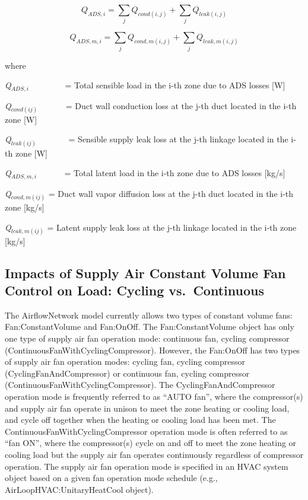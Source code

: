 \begin{equation}
{Q_{ADS,i}} = \sum\limits_j {{Q_{cond(i,j)}} + } \sum\limits_j {{Q_{leak(i,j)}}}
\end{equation}

\begin{equation}
{Q_{ADS,m,i}} = \sum\limits_j {{Q_{cond,m(i,j)}} + } \sum\limits_j {{Q_{leak,m(i,j)}}}
\end{equation}

where

\emph{Q\(_{ADS,i}\)}~~~~~~~~ = Total sensible load in the i-th zone due to ADS losses {[}W{]}

\emph{Q\(_{cond(ij)}\)}~~~~~~ = Duct wall conduction loss at the j-th duct located in the i-th zone {[}W{]}

\emph{Q\(_{leak(ij)}\)}~~~~~~~ = Sensible supply leak loss at the j-th linkage located in the i-th zone {[}W{]}

\emph{Q\(_{ADS,m,i}\)}~~~~~~ = Total latent load in the i-th zone due to ADS losses {[}kg/s{]}

\emph{Q\(_{cond,m(ij)}\)} = Duct wall vapor diffusion loss at the j-th duct located in the i-th zone {[}kg/s{]}

\emph{Q\(_{leak,m(ij)}\)} = Latent supply leak loss at the j-th linkage located in the i-th zone {[}kg/s{]}

\subsection{Impacts of Supply Air Constant Volume Fan Control on Load: Cycling vs.~Continuous}\label{impacts-of-supply-air-constant-volume-fan-control-on-load-cycling-vs.continuous}

The AirflowNetwork model currently allows two types of constant volume fans: Fan:ConstantVolume and Fan:OnOff. The Fan:ConstantVolume object has only one type of supply air fan operation mode: continuous fan, cycling compressor (ContinuousFanWithCyclingCompressor). However, the Fan:OnOff has two types of supply air fan operation modes: cycling fan, cycling compressor (CyclingFanAndCompressor) or continuous fan, cycling compressor (ContinuousFanWithCyclingCompressor). The CyclingFanAndCompressor operation mode is frequently referred to as ``AUTO fan'', where the compressor(s) and supply air fan operate in unison to meet the zone heating or cooling load, and cycle off together when the heating or cooling load has been met. The ContinuousFanWithCyclingCompressor operation mode is often referred to as ``fan ON'', where the compressor(s) cycle on and off to meet the zone heating or cooling load but the supply air fan operates continuously regardless of compressor operation. The supply air fan operation mode is specified in an HVAC system object based on a given fan operation mode schedule (e.g., AirLoopHVAC:UnitaryHeatCool object).

